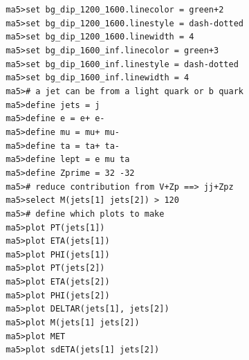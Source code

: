 \documentclass[a4paper, 10pt]{article}
\begin{document}
\texttt{ }\texttt{ }\texttt{ma5>set bg\_dip\_1200\_1600.linecolor = green+2\\
}
\texttt{ }\texttt{ }\texttt{ma5>set bg\_dip\_1200\_1600.linestyle = dash-dotted\\
}
\texttt{ }\texttt{ }\texttt{ma5>set bg\_dip\_1200\_1600.linewidth = 4\\
}
\texttt{ }\texttt{ }\texttt{ma5>set bg\_dip\_1600\_inf.linecolor = green+3\\
}
\texttt{ }\texttt{ }\texttt{ma5>set bg\_dip\_1600\_inf.linestyle = dash-dotted\\
}
\texttt{ }\texttt{ }\texttt{ma5>set bg\_dip\_1600\_inf.linewidth = 4\\
}
\texttt{ }\texttt{ }\texttt{ma5>\# a jet can be from a light quark or b quark\\
}
\texttt{ }\texttt{ }\texttt{ma5>define jets = j\\
}
\texttt{ }\texttt{ }\texttt{ma5>define e = e+ e-\\
}
\texttt{ }\texttt{ }\texttt{ma5>define mu = mu+ mu-\\
}
\texttt{ }\texttt{ }\texttt{ma5>define ta = ta+ ta-\\
}
\texttt{ }\texttt{ }\texttt{ma5>define lept = e mu ta\\
}
\texttt{ }\texttt{ }\texttt{ma5>define Zprime = 32 -32\\
}
\texttt{ }\texttt{ }\texttt{ma5>\# reduce contribution from V+Zp ==> jj+Zpz\\
}
\texttt{ }\texttt{ }\texttt{ma5>select M(jets[1] jets[2]) > 120\\
}
\texttt{ }\texttt{ }\texttt{ma5>\# define which plots to make\\
}
\texttt{ }\texttt{ }\texttt{ma5>plot PT(jets[1])\\
}
\texttt{ }\texttt{ }\texttt{ma5>plot ETA(jets[1])\\
}
\texttt{ }\texttt{ }\texttt{ma5>plot PHI(jets[1])\\
}
\texttt{ }\texttt{ }\texttt{ma5>plot PT(jets[2])\\
}
\texttt{ }\texttt{ }\texttt{ma5>plot ETA(jets[2])\\
}
\texttt{ }\texttt{ }\texttt{ma5>plot PHI(jets[2])\\
}
\texttt{ }\texttt{ }\texttt{ma5>plot DELTAR(jets[1], jets[2])\\
}
\texttt{ }\texttt{ }\texttt{ma5>plot M(jets[1] jets[2])\\
}
\texttt{ }\texttt{ }\texttt{ma5>plot MET\\
}
\texttt{ }\texttt{ }\texttt{ma5>plot sdETA(jets[1] jets[2])\\
}
\end{document}
